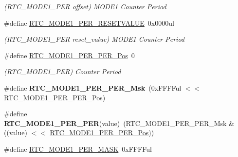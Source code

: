 \begin{DoxyCompactItemize}
\begin{DoxyCompactList}\small\item\em (R\+T\+C\+\_\+\+M\+O\+D\+E1\+\_\+\+P\+E\+R offset) M\+O\+D\+E1 Counter Period \end{DoxyCompactList}\item 
\hypertarget{group___s_a_m_l21___r_t_c_gaa43fbe8b477beef1223d91740c4fcc20}{}\#define \hyperlink{group___s_a_m_l21___r_t_c_gaa43fbe8b477beef1223d91740c4fcc20}{R\+T\+C\+\_\+\+M\+O\+D\+E1\+\_\+\+P\+E\+R\+\_\+\+R\+E\+S\+E\+T\+V\+A\+L\+U\+E}~0x0000ul\label{group___s_a_m_l21___r_t_c_gaa43fbe8b477beef1223d91740c4fcc20}

\begin{DoxyCompactList}\small\item\em (R\+T\+C\+\_\+\+M\+O\+D\+E1\+\_\+\+P\+E\+R reset\+\_\+value) M\+O\+D\+E1 Counter Period \end{DoxyCompactList}\item 
\hypertarget{group___s_a_m_l21___r_t_c_ga22b3aac719285a9cb2cc7c00f2c6ec6d}{}\#define \hyperlink{group___s_a_m_l21___r_t_c_ga22b3aac719285a9cb2cc7c00f2c6ec6d}{R\+T\+C\+\_\+\+M\+O\+D\+E1\+\_\+\+P\+E\+R\+\_\+\+P\+E\+R\+\_\+\+Pos}~0\label{group___s_a_m_l21___r_t_c_ga22b3aac719285a9cb2cc7c00f2c6ec6d}

\begin{DoxyCompactList}\small\item\em (R\+T\+C\+\_\+\+M\+O\+D\+E1\+\_\+\+P\+E\+R) Counter Period \end{DoxyCompactList}\item 
\hypertarget{group___s_a_m_l21___r_t_c_ga76004ab3fe0d4f47aed34643f28dcfda}{}\#define {\bfseries R\+T\+C\+\_\+\+M\+O\+D\+E1\+\_\+\+P\+E\+R\+\_\+\+P\+E\+R\+\_\+\+Msk}~(0x\+F\+F\+F\+Ful $<$$<$ R\+T\+C\+\_\+\+M\+O\+D\+E1\+\_\+\+P\+E\+R\+\_\+\+P\+E\+R\+\_\+\+Pos)\label{group___s_a_m_l21___r_t_c_ga76004ab3fe0d4f47aed34643f28dcfda}

\item 
\hypertarget{group___s_a_m_l21___r_t_c_gaa8cff11e7bc107339d32c99b10417677}{}\#define {\bfseries R\+T\+C\+\_\+\+M\+O\+D\+E1\+\_\+\+P\+E\+R\+\_\+\+P\+E\+R}(value)~(R\+T\+C\+\_\+\+M\+O\+D\+E1\+\_\+\+P\+E\+R\+\_\+\+P\+E\+R\+\_\+\+Msk \& ((value) $<$$<$ \hyperlink{group___s_a_m_l21___r_t_c_ga22b3aac719285a9cb2cc7c00f2c6ec6d}{R\+T\+C\+\_\+\+M\+O\+D\+E1\+\_\+\+P\+E\+R\+\_\+\+P\+E\+R\+\_\+\+Pos}))\label{group___s_a_m_l21___r_t_c_gaa8cff11e7bc107339d32c99b10417677}

\item 
\hypertarget{group___s_a_m_l21___r_t_c_ga34aabe756997ee1730612a0850dbe339}{}\#define \hyperlink{group___s_a_m_l21___r_t_c_ga34aabe756997ee1730612a0850dbe339}{R\+T\+C\+\_\+\+M\+O\+D\+E1\+\_\+\+P\+E\+R\+\_\+\+M\+A\+S\+K}~0x\+F\+F\+F\+Ful\label{group___s_a_m_l21___r_t_c_ga34aabe756997ee1730612a0850dbe339}


\end{DoxyCompactItemize}
